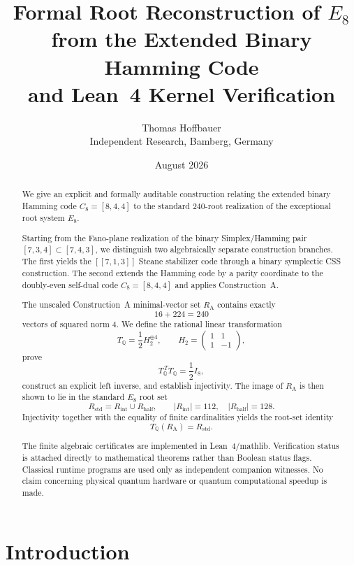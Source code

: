\documentclass[11pt,a4paper]{article}
\title{
Formal Root Reconstruction of $E_8$ from the Extended Binary Hamming Code\\
and Lean~4 Kernel Verification
}
\author{
Thomas Hoffbauer\\
\small Independent Research, Bamberg, Germany
}
\date{August 2026}
\theoremstyle{definition}
\theoremstyle{remark}
\newcommand{\RA}{R_{\mathrm A}}
\newcommand{\Rstd}{R_{\mathrm{std}}}
\newcommand{\TQ}{T_{\mathbb Q}}
\begin{document}
\maketitle


\begin{abstract}
We give an explicit and formally auditable construction relating the extended
binary Hamming code $C_8=[8,4,4]$ to the standard $240$-root realization of
the exceptional root system $E_8$.

Starting from the Fano-plane realization of the binary Simplex/Hamming pair
$[7,3,4]\subset[7,4,3]$, we distinguish two algebraically separate
construction branches.  The first yields the $[[7,1,3]]$ Steane stabilizer
code through a binary symplectic CSS construction.  The second extends the
Hamming code by a parity coordinate to the doubly-even self-dual code
$C_8=[8,4,4]$ and applies Construction~A.

The unscaled Construction~A minimal-vector set $\RA$ contains exactly
\[
16+224=240
\]
vectors of squared norm $4$.  We define the rational linear transformation
\[
\TQ=\frac12 H_2^{\oplus4},
\qquad
H_2=
\begin{pmatrix}
1&1\\
1&-1
\end{pmatrix},
\]
prove
\[
\TQ^{\,T}\TQ=\frac12I_8,
\]
construct an explicit left inverse, and establish injectivity.  The image of
$\RA$ is then shown to lie in the standard $E_8$ root set
\[
\Rstd=R_{\mathrm{int}}\cup R_{\mathrm{half}},
\qquad
|R_{\mathrm{int}}|=112,\quad |R_{\mathrm{half}}|=128.
\]
Injectivity together with the equality of finite cardinalities yields the
root-set identity
\[
\TQ(\RA)=\Rstd.
\]

The finite algebraic certificates are implemented in Lean~4/mathlib.
Verification status is attached directly to mathematical theorems rather
than Boolean status flags.  Classical runtime programs are used only as
independent companion witnesses.  No claim concerning physical quantum
hardware or quantum computational speedup is made.
\end{abstract}

\section{Introduction}
\end{document}
